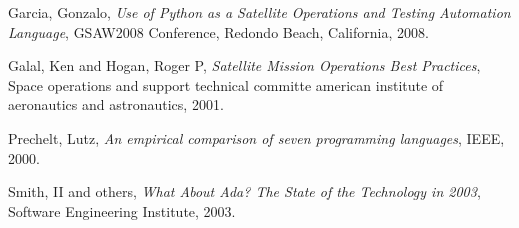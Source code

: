 \documentclass[twoside,twocolumn]{article}
\begin{document}
\begin{thebibliography}{99} %


  Garcia, Gonzalo,
  \textit{Use of Python as a Satellite Operations and Testing Automation Language},
  GSAW2008 Conference, Redondo Beach, California,
  2008.
  
  Galal, Ken and Hogan, Roger P,
  \textit{Satellite Mission Operations Best Practices},
  Space operations and support technical committe american institute of aeronautics and astronautics,
  2001.

  Prechelt, Lutz,
  \textit{An empirical comparison of seven programming languages},
  IEEE,
  2000.
  
  
  
  Smith, II and others,
  \textit{What About Ada? The State of the Technology in 2003},
  Software Engineering Institute,
  2003.

  
  

% 



\end{thebibliography}
\end{document}
